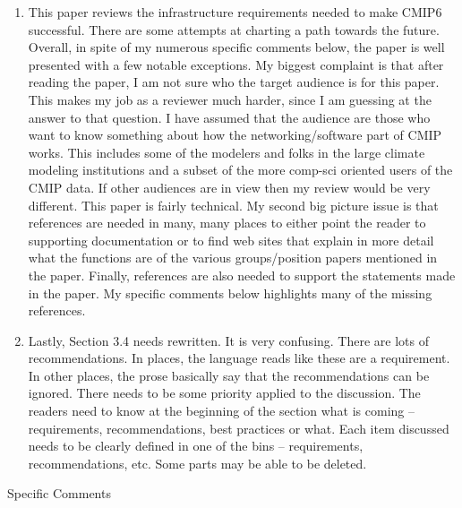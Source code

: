 \documentclass[gmd,manuscript]{copernicus}
\begin{document}
\begin{enumerate}[label=RC1-Overview-\arabic*,leftmargin=*]
\item This paper reviews the infrastructure requirements needed to
  make CMIP6 successful. There are some attempts at charting a path
  towards the future. Overall, in spite of my numerous specific
  comments below, the paper is well presented with a few notable
  exceptions. My biggest complaint is that after reading the paper, I
  am not sure who the target audience is for this paper. This makes my
  job as a reviewer much harder, since I am guessing at the answer to
  that question. I have assumed that the audience are those who want
  to know something about how the networking/software part of CMIP
  works. This includes some of the modelers and folks in the large
  climate modeling institutions and a subset of the more comp-sci
  oriented users of the CMIP data. If other audiences are in view then
  my review would be very different. This paper is fairly technical.
  My second big picture issue is that references are needed in many,
  many places to either point the reader to supporting documentation
  or to find web sites that explain in more detail what the functions
  are of the various groups/position papers mentioned in the paper.
  Finally, references are also needed to support the statements made
  in the paper. My specific comments below highlights many of the
  missing references.
\item Lastly, Section 3.4 needs rewritten. It is very confusing. There
  are lots of recommendations. In places, the language reads like
  these are a requirement. In other places, the prose basically say
  that the recommendations can be ignored. There needs to be some
  priority applied to the discussion. The readers need to know at the
  beginning of the section what is coming – requirements,
  recommendations, best practices or what. Each item discussed needs
  to be clearly defined in one of the bins – requirements,
  recommendations, etc. Some parts may be able to be deleted.
\end{enumerate}

Specific Comments
\end{document}
